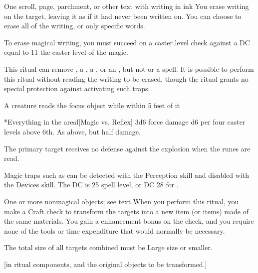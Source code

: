 \begin{spelltarget}{One scroll, page, parchment, or other text with writing in ink}
    \spelleffect You erase writing on the target, leaving it as if it had never been written on. You can choose to erase all of the writing, or only specific words.

    To erase magical writing, you must succeed on a caster level check against a DC equal to 11 \add the caster level of the magic.
\end{spelltarget}
\spellnotes This ritual can remove , a , a , or an , but not  or a  spell. It is possible to perform this ritual without reading the writing to be erased, though the ritual grants no special protection against activating such traps.

\spellline
\begin{spelltrigger}{A creature reads the focus object while within 5 feet of it}
    \begin{spelltargets}*{Everything in the area}l[Magic vs. Reflex]
        \spellsuccess 3d6 force damage \add d6 per four caster levels above 6th.
        \spellfailure As above, but half damage.
    \end{spelltargets}
\end{spelltrigger}
\spellnotes The primary target receives no defense against the explosion when the runes are read.

Magic traps such as  can be detected with the Perception skill and disabled with the Devices skill. The DC is 25 \add spell level, or DC 28 for .

\spellrng{\rngclose}
\begin{spelltargets}{One or more nonmagical objects; see text}
    \spelleffect When you perform this ritual, you make a Craft check to transform the targets into a new item (or items) made of the same materials. You gain a  enhancement bonus on the check, and you require none of the tools or time expenditure that would normally be necessary.

    The total size of all targets combined must be Large size or smaller. 
\end{spelltargets}
[in ritual components, and the original objects to be transformed.]

